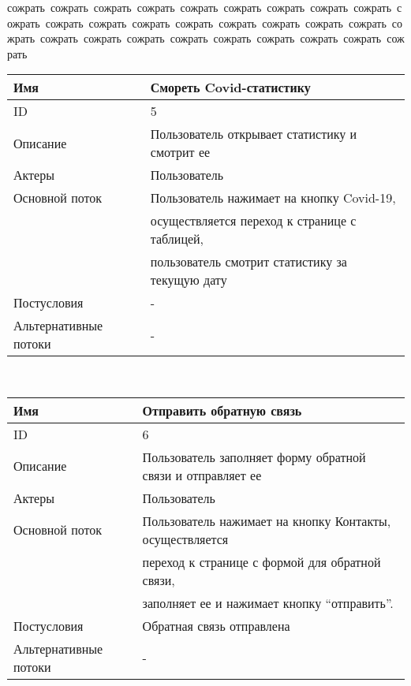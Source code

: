 \newpage
\BgThispage
\begin{flushright}
    \mbox{сожрать сожрать сожрать сожрать сожрать сожрать сожрать сожрать сожрать сожрать сожрать сожрать сожрать сожрать сожрать сожрать сожрать сожрать сожрать сожрать сожрать сожрать сожрать сожрать сожрать сожрать сожрать сожрать}
\end{flushright}
\begin{center}
    \small
    \begin{tabular}{|l|l|}
        \hline
        Имя                   & Смореть Covid-статистику                        \\
        \hline
        ID                    & 5                                               \\
        \hline
        Описание              & Пользователь открывает статистику и смотрит ее  \\
        \hline
        Актеры                & Пользователь                                    \\
        \hline
        Основной поток        & Пользователь нажимает на кнопку Covid-19,       \\
        & осуществляется переход к странице с таблицей,   \\
        & пользователь смотрит статистику за текущую дату \\
        \hline
        Постусловия           & -                                               \\
        \hline
        Альтернативные потоки & -                                               \\
        \hline
    \end{tabular}\\
    \vspace{0.9cm}
    \begin{tabular}{|l|l|}
        \hline
        Имя                   & Отправить обратную связь                                    \\
        \hline
        ID                    & 6                                                           \\
        \hline
        Описание              & Пользователь заполняет форму обратной связи и отправляет ее \\
        \hline
        Актеры                & Пользователь                                                \\
        \hline
        Основной поток        & Пользователь нажимает на кнопку Контакты, осуществляется    \\
        & переход к странице с формой для обратной связи,             \\
        & заполняет ее и нажимает кнопку “отправить”.                 \\
        \hline
        Постусловия           & Обратная связь отправлена                                   \\
        \hline
        Альтернативные потоки & -                                                           \\
        \hline
    \end{tabular}


\end{center}
